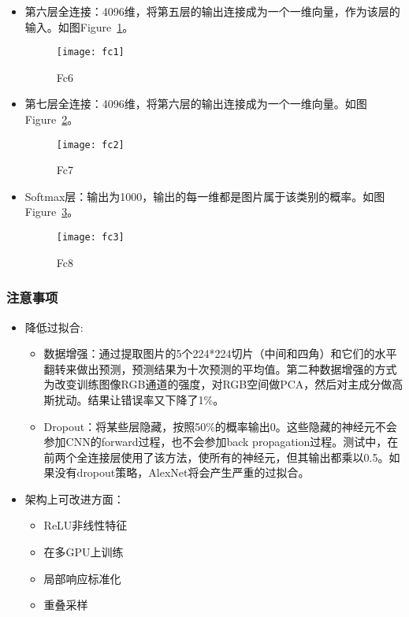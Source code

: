 \begin{itemize}
\item 第六层全连接：4096维，将第五层的输出连接成为一个一维向量，作为该层的输入。如图Figure~\ref{fig:fc6}。
	\begin{figure}[!ht]
	\centering
	\texttt{[image: fc1]}
	\caption{Fc6}
	\label{fig:fc6}
	\end{figure}
\item 第七层全连接：4096维，将第六层的输出连接成为一个一维向量。如图Figure~\ref{fig:fc7}。
	\begin{figure}[!ht]
	\centering
	\texttt{[image: fc2]}
	\caption{Fc7}
	\label{fig:fc7}
	\end{figure}
\item Softmax层：输出为1000，输出的每一维都是图片属于该类别的概率。如图Figure~\ref{fig:fc8}。
	\begin{figure}[!ht]
	\centering
	\texttt{[image: fc3]}
	\caption{Fc8}
	\label{fig:fc8}
	\end{figure}
\end{itemize}


\subsubsection{注意事项}
\begin{itemize}
\item 降低过拟合:
\begin{itemize}
\item 数据增强：通过提取图片的5个224*224切片（中间和四角）和它们的水平翻转来做出预测，预测结果为十次预测的平均值。第二种数据增强的方式为改变训练图像RGB通道的强度，对RGB空间做PCA，然后对主成分做高斯扰动。结果让错误率又下降了1\%。

\item Dropout：将某些层隐藏，按照50\%的概率输出0。这些隐藏的神经元不会参加CNN的forward过程，也不会参加back propagation过程。测试中，在前两个全连接层使用了该方法，使所有的神经元，但其输出都乘以0.5。如果没有dropout策略，AlexNet将会产生严重的过拟合。\newline
\end{itemize}

\item 架构上可改进方面：
\begin{itemize}
\item ReLU非线性特征 
\item 在多GPU上训练
\item 局部响应标准化
\item 重叠采样
\end{itemize}
\end{itemize}






